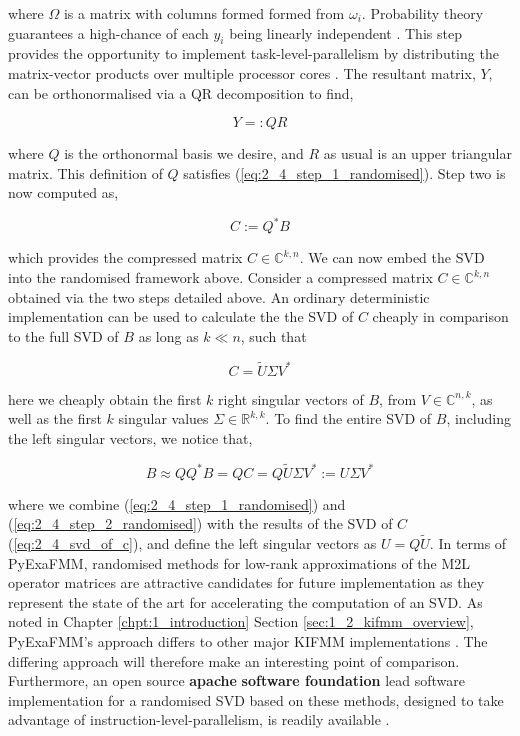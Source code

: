 where $\Omega$ is a matrix with columns formed formed from $\omega_i$.
Probability theory guarantees a high-chance of each $y_i$ being linearly independent
\cite{Erichson:2019:JOSS}. This step provides the opportunity to implement
\gls{task-level-parallelism} by distributing the matrix-vector products over multiple
processor cores \cite{Halko:2011:SIAM}. The resultant matrix, $Y$, can be
orthonormalised via a QR decomposition to find,

\begin{equation}
    Y =: QR
\end{equation}

where $Q$ is the orthonormal basis we desire, and $R$ as usual is an upper triangular
matrix. This definition of $Q$ satisfies (\ref{eq:2_4_step_1_randomised}). Step two
is now computed as,

\begin{equation}
    C := Q^* B
    \label{eq:2_4_step_2_randomised}
\end{equation}

which provides the compressed matrix $C \in \mathbb{C}^{k, n}$.
We can now embed the \gls{SVD} into the randomised framework above. Consider a compressed matrix
$C \in \mathbb{C}^{k, n}$ obtained via the two steps detailed above. An
ordinary deterministic implementation can be used to calculate the
the \gls{SVD} of $C$ cheaply in comparison to the full SVD of $B$ as long as
$k \ll n$, such that

\begin{equation}
    C = \tilde{U}\Sigma V^*
    \label{eq:2_4_svd_of_c}
\end{equation}

here we cheaply obtain the first $k$ right singular vectors of $B$,
from $V \in \mathbb{C}^{n, k}$, as well as the first $k$ singular values
$\Sigma \in \mathbb{R}^{k, k}$. To find the entire \gls{SVD} of $B$, including the
left singular vectors, we notice that,

\begin{equation}
    B \approx Q Q^* B = QC = Q \tilde{U} \Sigma V^* := U\Sigma V^*
\end{equation}

where we combine (\ref{eq:2_4_step_1_randomised}) and (\ref{eq:2_4_step_2_randomised})
with the results of the \gls{SVD} of $C$ (\ref{eq:2_4_svd_of_c}), and define the
left singular vectors as $U = Q \tilde{U}$. In terms of \gls{PyExaFMM}, randomised
methods for low-rank approximations of the M2L operator matrices are attractive candidates
for future implementation as they represent the state of the art for accelerating the computation of an \gls{SVD}.
As noted in Chapter \ref{chpt:1_introduction} Section \ref{sec:1_2_kifmm_overview},
\gls{PyExaFMM}'s approach differs to other major \gls{KIFMM} implementations \cite{Malhotra:2015:CCP,exafmm}.
The differing approach will therefore make an interesting point of comparison. Furthermore,
an open source \textbf{\gls{apache}} \textbf{software foundation} lead software implementation for
a randomised \gls{SVD} based on these methods, designed to take advantage
of \gls{instruction-level-parallelism}, is readily available \cite{mahout}.
